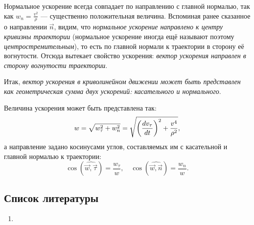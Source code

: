 Нормальное ускорение всегда совпадает по направлению с главной нормалью, так как
$w_n = \frac{v^2}{\rho}$ --- существенно положительная величина. Вспоминая ранее
сказанное о направлении $\vec{n}$, видим, что \textit{нормальное ускорение
направлено к центру кривизны траектории} (нормальное ускорение иногда ещё
называют поэтому \textit{центростремительным}), то есть по главной нормали к
траектории в сторону её вогнутости. Отсюда вытекает свойство ускорения:
\textit{вектор ускорения направлен в сторону вогнутости траектории}.

Итак, \textit{вектор ускорения в криволинейном движении может быть представлен
как геометрическая сумма двух ускорений: касательного и нормального}.

Величина ускорения может быть представлена так:
\begin{equation}
  w = \sqrt{w_\tau^2 + w_n^2} =
    \sqrt{\paren{\dt[v_\tau]}^2 + \frac{v^4}{\rho^2}},
\end{equation}
а направление задано косинусами углов, составляемых им с касательной и главной
нормалью к траектории:
\begin{equation}
  \cos(\widehat{\vec{w}, \vec{\tau}}) = \frac{w_\tau}{w}, \quad
  \cos(\widehat{\vec{w}, \vec{n}}) = \frac{w_n}{w}.
\end{equation}

\subsection{Список литературы}
\begin{enumerate}
  \item \cite{lourie}
\end{enumerate}

